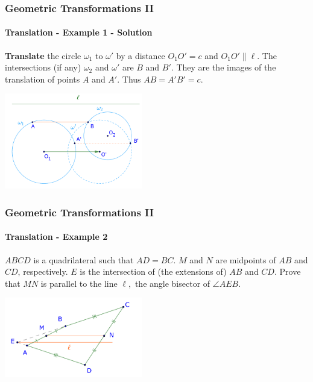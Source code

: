 \documentclass[8pt,xcolor=table,dvipsnames]{beamer}
\begin{document}
\begin{frame}[t]
    \frametitle{Geometric Transformations II}
    \framesubtitle{Translation - Example 1 - Solution}
    \textbf{Translate} the circle $\omega_1$ to $\omega'$ by a distance $O_1O' = c$ and $O_1O' \parallel \ell.$
    \bigbreak
    The intersections (if any) $\omega_2$ and $\omega'$ are $B$ and $B'$.
    \bigbreak
    They are the images of the translation of points $A$ and $A'$.
    Thus $AB = A'B' = c.$
    \begin{center}
        \includegraphics[width=6cm]{./svg/pdf/translation-5-1.pdf}
    \end{center}
\end{frame}

\begin{frame}[t]
    \frametitle{Geometric Transformations II}
    \framesubtitle{Translation - Example 2}
    \begin{example}
        $ABCD$ is a quadrilateral such that $AD = BC.$ $M$ and $N$ are midpoints of $AB$ and $CD$, respectively.
        \bigbreak
        $E$ is the intersection of (the extensions of) $AB$ and $CD.$
        \bigbreak
        Prove that $MN$ is parallel to the line $\ell,$ the angle bisector of $\angle AEB.$
    \end{example}
    \bigbreak
    \begin{center}
        \includegraphics[width=6cm]{./svg/pdf/translation-4.pdf}
    \end{center}
\end{frame}
\end{document}

